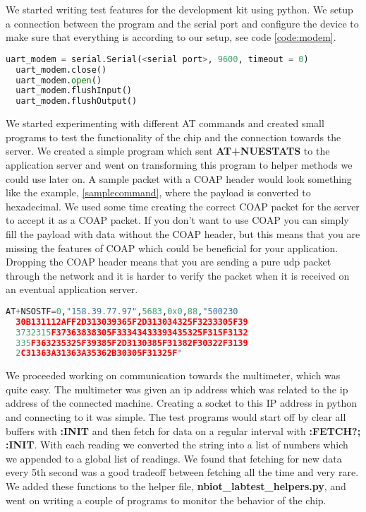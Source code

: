 \documentclass[USenglish]{ifimaster}  %
\begin{document}
We started writing test features for the development kit using python. We setup a connection between the program and the serial port and configure the device to make sure that everything is according to our setup, see code \vref{code:modem}.

\begin{lstlisting}[caption={Development kit initiation},label={code:modem},language=Python]
  uart_modem = serial.Serial(<serial port>, 9600, timeout = 0)
  uart_modem.close()
  uart_modem.open()
  uart_modem.flushInput()
  uart_modem.flushOutput()
\end{lstlisting}

We started experimenting with different AT commands and created small programs to test the functionality of the chip and the connection towards the server. We created a simple program which sent \textbf{AT+NUESTATS} to the application server and went on transforming this program to helper methods we could use later on. A sample packet with a COAP header would look something like the example, \vref{samplecommand}, where the payload is converted to hexadecimal. We used some time creating the correct COAP packet for the server to accept it as a COAP packet. If you don't want to use COAP you can simply fill the payload with data without the COAP header, but this means that you are missing the features of COAP which could be beneficial for your application. Dropping the COAP header means that you are sending a pure \acrshort{udp} packet through the network and it is harder to verify the packet when it is received on an eventual application server.

\begin{lstlisting}[caption={Sample transmit 158.39.77.97:5683, 88 bytes},label={samplecommand},language=Python]
  AT+NSOSTF=0,"158.39.77.97",5683,0x0,88,"500230
  30B131112AFF2D313039365F2D313034325F3233305F39
  3732315F37363838305F33343433393435325F315F3132
  335F363235325F39385F2D3130385F31382F30322F3139
  2C31363A31363A35362B30305F31325F"
\end{lstlisting}

We proceeded working on communication towards the multimeter, which was quite easy. The multimeter was given an \acrshort{ip} address which was related to the \acrshort{ip} address of the connected machine. Creating a socket to this IP address in python and connecting to it was simple. The test programs would start off by clear all buffers with \textbf{:INIT} and then fetch for data on a regular interval with \textbf{:FETCH?; :INIT}. With each reading we converted the string into a list of numbers which we appended to a global list of readings. We found that fetching for new data every 5th second was a good tradeoff between fetching all the time and very rare. We added these functions to the helper file, \textbf{nbiot\_labtest\_helpers.py}, and went on writing a couple of programs to monitor the behavior of the chip.
\end{document}
